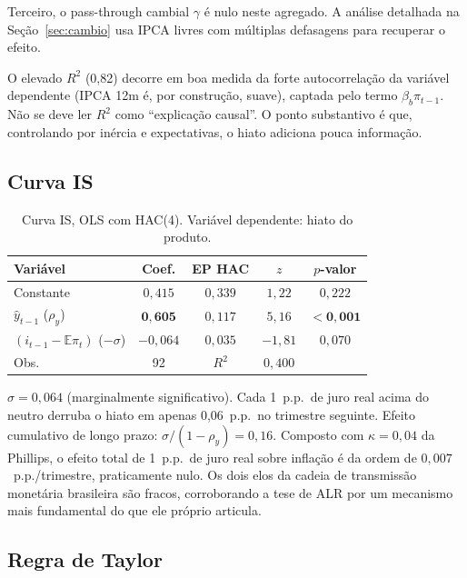 \documentclass[11pt,a4paper]{article}
\begin{document}
Terceiro, o pass-through cambial $\gamma$ é nulo neste agregado. A análise
detalhada na Seção~\ref{sec:cambio} usa IPCA livres com múltiplas defasagens
para recuperar o efeito.

O elevado $R^2$ (0,82) decorre em boa medida da forte autocorrelação da
variável dependente (IPCA 12m é, por construção, suave), captada pelo
termo $\beta_b \pi_{t-1}$. Não se deve ler $R^2$ como ``explicação causal''.
O ponto substantivo é que, controlando por inércia e expectativas, o
hiato adiciona pouca informação.

\subsection{Curva IS}

\begin{table}[H]
\centering
\small
\begin{tabular}{lcccc}
\toprule
Variável & Coef. & EP HAC & $z$ & $p$-valor \\
\midrule
Constante & $0{,}415$ & $0{,}339$ & $1{,}22$ & $0{,}222$ \\
$\hat{y}_{t-1}$ ($\rho_y$) & $\mathbf{0{,}605}$ & $0{,}117$ & $5{,}16$ & $\mathbf{<0{,}001}$ \\
$(i_{t-1} - \mathbb{E}\pi_t)$ ($-\sigma$) & $-0{,}064$ & $0{,}035$ & $-1{,}81$ & $0{,}070$ \\
\midrule
Obs. & 92 & $R^2$ & $0{,}400$ & \\
\bottomrule
\end{tabular}
\caption{Curva IS, OLS com HAC(4). Variável dependente: hiato do produto.}
\label{tab:is}
\end{table}

$\sigma = 0{,}064$ (marginalmente significativo). Cada 1~p.p.\ de juro
real acima do neutro derruba o hiato em apenas 0{,}06~p.p.\ no trimestre
seguinte. Efeito cumulativo de longo prazo: $\sigma/(1-\rho_y) = 0{,}16$.
Composto com $\kappa = 0{,}04$ da Phillips, o efeito total de 1~p.p.\ de
juro real sobre inflação é da ordem de $0{,}007$~p.p./trimestre,
praticamente nulo. Os dois elos da cadeia de transmissão
monetária brasileira são fracos, corroborando a tese de ALR por um
mecanismo mais fundamental do que ele próprio articula.

\subsection{Regra de Taylor}
\end{document}
